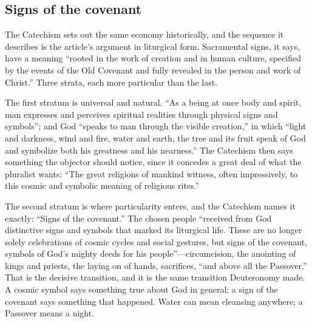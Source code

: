 \subsection{Signs of the covenant}

The Catechism sets out the same economy historically, and the sequence it describes is the article's argument in liturgical form. Sacramental signs, it says, have a meaning ``rooted in the work of creation and in human culture, specified by the events of the Old Covenant and fully revealed in the person and work of Christ.'' Three strata, each more particular than the last.

The first stratum is universal and natural. ``As a being at once body and spirit, man expresses and perceives spiritual realities through physical signs and symbols''; and God ``speaks to man through the visible creation,'' in which ``light and darkness, wind and fire, water and earth, the tree and its fruit speak of God and symbolize both his greatness and his nearness.'' The Catechism then says something the objector should notice, since it concedes a great deal of what the pluralist wants: ``The great religions of mankind witness, often impressively, to this cosmic and symbolic meaning of religious rites.''

The second stratum is where particularity enters, and the Catechism names it exactly: ``Signs of the covenant.'' The chosen people ``received from God distinctive signs and symbols that marked its liturgical life. These are no longer solely celebrations of cosmic cycles and social gestures, but signs of the covenant, symbols of God's mighty deeds for his people''---circumcision, the anointing of kings and priests, the laying on of hands, sacrifices, ``and above all the Passover.'' That is the decisive transition, and it is the same transition Deuteronomy made. A cosmic symbol says something true about God in general; a sign of the covenant says something that happened. Water can mean cleansing anywhere; a Passover means a night.


